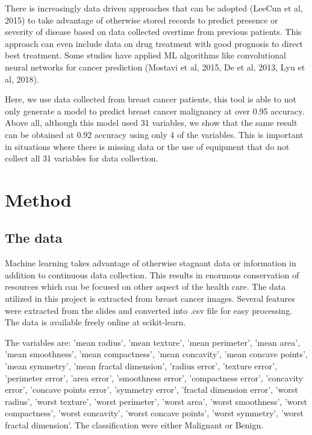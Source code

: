 \documentclass[conference]{IEEEtran}
\begin{document}
There is increasingly data driven approaches that can be adopted (LeeCun et al, 2015) to take advantage of otherwise stored records to predict presence or severity of disease based on data collected overtime from previous patients. This approach can even include data on drug treatment with good prognosis to direct best treatment. Some studies have applied ML algorithms like convolutional neural networks for cancer prediction (Mostavi et al, 2015, De et al, 2013, Lyu et al, 2018). 

Here, we use data collected from breast cancer patients, this tool is able to not only generate a model to predict breast cancer malignancy at over 0.95 accuracy. Above all, although this model used 31 variables, we show that the same result can be obtained at 0.92 accuracy using only 4 of the variables. This is important in situations where there is missing data or the use of equipment that do not collect all 31 variables for data collection. 

\section{Method}

\subsection{The data}

Machine learning takes advantage of otherwise stagnant data or information in addition to continuous data collection. This results in enormous conservation of resources which can be focused on other aspect of the health care. The data utilized in this project is extracted from breast cancer images. Several features were extracted from the slides and converted into .csv file for easy processing. The data is available freely online at scikit-learn.

The variables are: 
'mean radius', 'mean texture', 'mean perimeter', 'mean area',
        'mean smoothness', 'mean compactness', 'mean concavity',
        'mean concave points', 'mean symmetry', 'mean fractal dimension',
        'radius error', 'texture error', 'perimeter error', 'area error',
        'smoothness error', 'compactness error', 'concavity error',
        'concave points error', 'symmetry error',
        'fractal dimension error', 'worst radius', 'worst texture',
        'worst perimeter', 'worst area', 'worst smoothness',
        'worst compactness', 'worst concavity', 'worst concave points',
        'worst symmetry', 'worst fractal dimension'. The classification were either Malignant or Benign.
\end{document}
